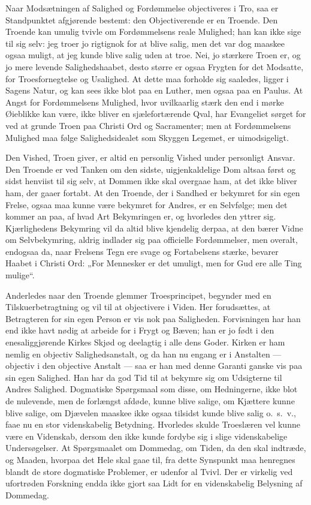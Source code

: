 \documentclass[12pt]{book}
\begin{document}
Naar Modsætningen af Salighed og Fordømmelse objectiveres i Tro, saa
er Standpunktet afgjørende bestemt: den Objectiverende er en
Troende. Den Troende kan umulig tvivle om Fordømmelsens reale
Mulighed; han kan ikke sige til sig selv: jeg troer jo rigtignok for
at blive salig, men det var dog maaskee ogsaa muligt, at jeg kunde
blive salig uden at troe. Nei, jo stærkere Troen er, og jo mere
levende Salighedshaabet, desto større er ogsaa Frygten for det
Modsatte, for Troesfornegtelse og Usalighed. At dette maa forholde
sig saaledes, ligger i Sagens Natur, og kan sees ikke blot paa en
Luther, men ogsaa paa en Paulus. At Angst for Fordømmelsens
Mulighed, hvor uvilkaarlig stærk den end i mørke Øieblikke kan være,
ikke bliver en sjælefortærende Qval, har Evangeliet sørget for ved
at grunde Troen paa Christi Ord og Sacramenter; men at Fordømmelsens
Mulighed maa følge Salighedsidealet som Skyggen Legemet, er
uimodsigeligt.

Den Vished, Troen giver, er altid en personlig Vished under
personligt Ansvar. Den Troende er ved Tanken om den sidste,
uigjenkaldelige Dom altsaa først og sidst henviist til sig selv, at
Dommen ikke skal overgaae ham, at det ikke bliver ham, der gaaer
fortabt. At den Troende, der i Sandhed er bekymret for sin egen
Frelse, ogsaa maa kunne være bekymret for Andres, er en Selvfølge;
men det kommer an paa, af hvad Art Bekymringen er, og hvorledes den
yttrer sig. Kjærlighedens Bekymring vil da altid blive kjendelig
derpaa, at den bærer Vidne om Selvbekymring, aldrig indlader sig paa
officielle Fordømmelser, men overalt, endogsaa da, naar Frelsens
Tegn ere svage og Fortabelsens stærke, bevarer Haabet i Christi Ord:
„For Mennesker er det umuligt, men for Gud ere alle Ting mulige“.

Anderledes naar den Troende glemmer Troesprincipet, begynder med en
Tilskuerbetragtning og vil til at objectivere i Viden. Her
forudsættes, at Betragteren for sin egen Person er vis nok paa
Saligheden. Forvisningen har han end ikke havt nødig at arbeide for
i Frygt og Bæven; han er jo født i den enesaliggjørende Kirkes Skjød
og deelagtig i alle dens Goder. Kirken er ham nemlig en objectiv
Salighedsanstalt, og da han nu engang er i Anstalten --- objectiv i
den objective Anstalt --- saa er han med denne Garanti ganske vis
paa sin egen Salighed. Han har da god Tid til at bekymre sig om
Udsigterne til Andres Salighed. Dogmatiske Spørgsmaal som disse, om
Hedningerne, ikke blot de nulevende, men de forlængst afdøde, kunne
blive salige, om Kjættere kunne blive salige, om Djævelen maaskee
ikke ogsaa tilsidst kunde blive salig o.\ s.\ v., faae nu en stor
videnskabelig Betydning. Hvorledes skulde Troeslæren vel kunne være
en Videnskab, dersom den ikke kunde fordybe sig i slige
videnskabelige Undersøgelser. At Spørgsmaalet om Dommedag, om Tiden,
da den skal indtræde, og Maaden, hvorpaa det Hele skal gaae til, fra
dette Synspunkt maa henregnes blandt de store dogmatiske Problemer,
er udenfor al Tvivl. Der er virkelig ved ufortrøden Forskning endda
ikke gjort saa Lidt for en videnskabelig Belysning af Dommedag.
\end{document}
